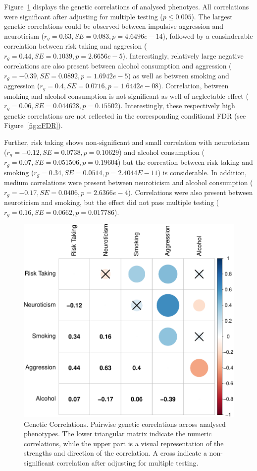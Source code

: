 Figure~\ref{fig:gcor} displays the genetic correlations of analysed phenotyes.
All correlations were significant after adjusting for multiple testing ($p\leq0.005$).
The largest genetic correlations could be observed between impulsive aggression and neuroticism ($r_g=0.63, SE=0.083, p=4.6496e-14$), 
followed by a consinderable correlation between risk taking and aggresion ($r_g=0.44, SE=0.1039, p=2.6656e-5$).
Interestingly, relatively large negative correlations are also present between alcohol consumption and aggression ($r_g=-0.39, SE=0.0892, p=1.6942e-5$)
as well as between smoking and aggression ($r_g=0.4, SE=0.0716, p=1.6442e-08$).
Correlation, between smoking and alcohol consumption is not significant as well of neglectable effect ($r_g=0.06, SE=0.044628, p=0.15502$).
Interestingly, these respectively high genetic correlations are not reflected in the corresponding conditional FDR (see Figure~\ref{fig:cFDR}).

Further, risk taking shows non-significant and small correlation with neuroticism ($r_g=-0.12, SE=0.0738, p=0.10629$) and
alcohol consumption ($r_g=0.07, SE=0.051506, p=0.19604$) but the correation between risk taking and smoking ($r_g=0.34, SE=0.0514, p=2.4044E-11$) is considerable.
In addition, medium correlations were present between neuroticism and alcohol consumption ($r_g=-0.17, SE=0.0406, p=2.6366e-4$). 
Correlations were also present between neuroticism and smoking, but the effect did not pass multiple testing ($r_g=0.16, SE=0.0662, p=0.017786$).

\begin{figure}[!h]
	\centering
  \includegraphics[width=0.8\linewidth]{figure/genetic_corr/gcorr_plot_circle_full_se.pdf}
  \caption{Genetic Correlations.
    Pairwise genetic correlations across analysed phenotypes.
    The lower triangular matrix indicate the numeric correlations, while the upper part is a visual representation of the strengths and direction of the correlation.
    A cross indicate a non-significant correlation after adjusting for multiple testing.
  }\label{fig:gcor}
\end{figure}


